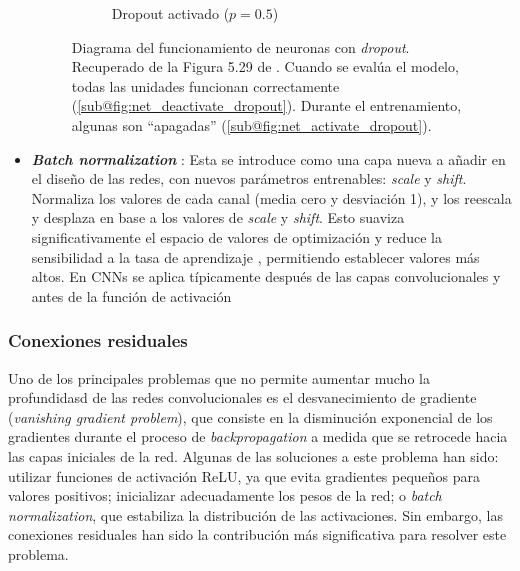 \begin{itemize}
\begin{figure}[h]
\begin{subfigure}[b]{0.45\textwidth}
            \caption{Dropout activado ($p=0.5$)}
            \label{fig:net_activate_dropout}
        \end{subfigure}

        \caption[
            Diagrama del funcionamiento de neuronas con \textit{dropout}.
            Recuperado de la Figura 5.29 de \cite{szeliski2010}.
        ]{
            Diagrama del funcionamiento de neuronas con \textit{dropout}.
            Recuperado de la Figura 5.29 de \cite{szeliski2010}.
            Cuando se evalúa el modelo, todas las unidades funcionan correctamente 
            (\ref{sub@fig:net_deactivate_dropout}). Durante el entrenamiento, algunas son ``apagadas'' 
            (\ref{sub@fig:net_activate_dropout}). 
        }
        \label{fig:net_with_dropout}
    \end{figure}
    
    \item \textbf{\textit{Batch normalization}} \cite{ioffe2015}: Esta se introduce como una capa nueva a 
    añadir en el diseño de las redes, con nuevos parámetros entrenables: \textit{scale} y \textit{shift}. 
    Normaliza los valores de cada canal (media cero y desviación 1), y los reescala y desplaza en base a los
    valores de \textit{scale} y \textit{shift}. 
    Esto suaviza significativamente el espacio de valores de optimización \cite{santurkar2019} y reduce la 
    sensibilidad a la tasa de aprendizaje \cite{arora2018}, permitiendo establecer valores más altos.
    En CNNs se aplica típicamente después de las capas convolucionales y antes de la función de activación
    
\end{itemize}


\subsubsection{Conexiones residuales}

Uno de los principales problemas que no permite aumentar mucho la profundidasd de las redes convolucionales 
es el desvanecimiento de gradiente (\textit{vanishing gradient problem}), que consiste en la disminución 
exponencial de los gradientes durante el proceso de \textit{backpropagation} a medida que se retrocede hacia 
las capas iniciales de la red. Algunas de las soluciones a este problema han sido: utilizar funciones de 
activación ReLU, ya que evita gradientes pequeños para valores positivos; inicializar adecuadamente los pesos
de la red; o \textit{batch normalization}, que estabiliza la distribución de las activaciones. Sin embargo,
las conexiones residuales han sido la contribución más significativa para resolver este problema.

